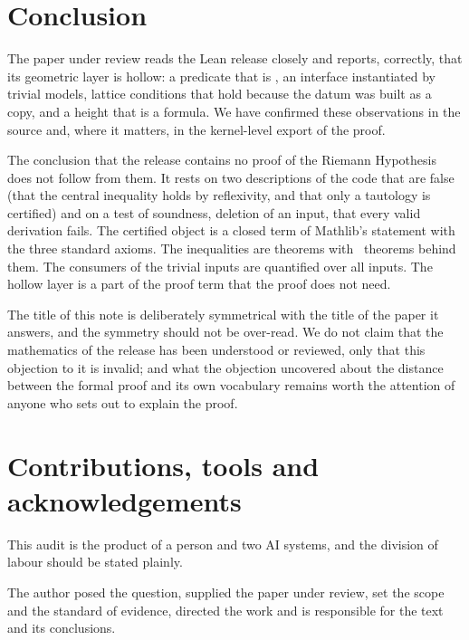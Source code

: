 \section{Conclusion}
\label{sec:conclusion}

The paper under review reads the Lean release closely and reports, correctly, that its geometric layer is hollow: a predicate that is , an interface instantiated by trivial models, lattice conditions that hold because the datum was built as a copy, and a height that is a formula.
We have confirmed these observations in the source and, where it matters, in the kernel-level export of the proof.

The conclusion that the release contains no proof of the Riemann Hypothesis does not follow from them.
It rests on two descriptions of the code that are false (that the central inequality holds by reflexivity, and that only a tautology is certified) and on a test of soundness, deletion of an input, that every valid derivation fails.
The certified object is a closed term of Mathlib's statement with the three standard axioms. The inequalities are theorems with \NdivClausesThm\ theorems behind them. The consumers of the trivial inputs are quantified over all inputs.
The hollow layer is a part of the proof term that the proof does not need.

The title of this note is deliberately symmetrical with the title of the paper it answers, and the symmetry should not be over-read.
We do not claim that the mathematics of the release has been understood or reviewed, only that this objection to it is invalid; and what the objection uncovered about the distance between the formal proof and its own vocabulary remains worth the attention of anyone who sets out to explain the proof.



\section*{Contributions, tools and acknowledgements}
\label{sec:contrib}

This audit is the product of a person and two AI systems, and the division of labour should be stated plainly.

The author posed the question, supplied the paper under review, set the scope and the standard of evidence, directed the work and is responsible for the text and its conclusions.


